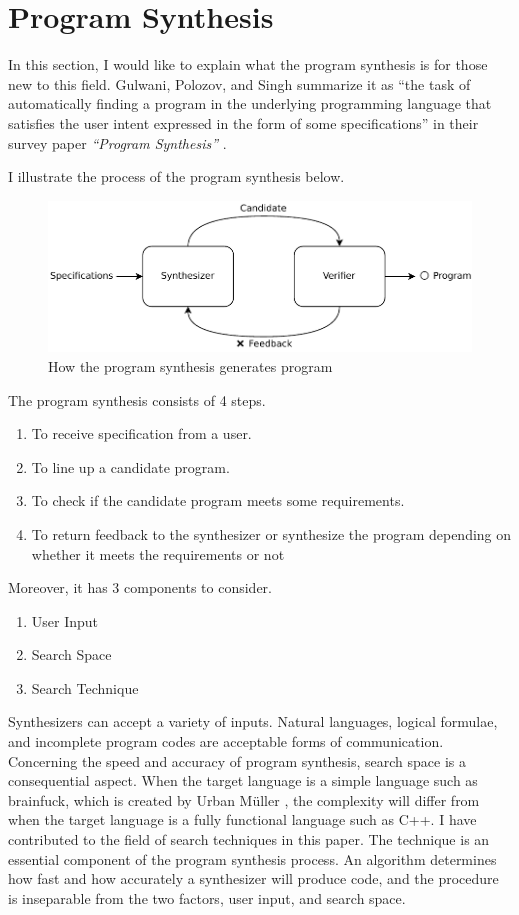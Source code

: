 \documentclass[12pt, a4paper, titlepage]{report}
\begin{document}
  \section{Program Synthesis}
    In this section, I would like to explain what the program synthesis is for those new to this field.
    Gulwani, Polozov, and Singh summarize it as ``the task of automatically finding a program in the underlying programming language that satisfies the user intent expressed in the form of some specifications'' in their survey paper \emph{``Program Synthesis''} \cite{gulwani:2017}.

    I illustrate the process of the program synthesis below.
    \begin{figure}[htbp]
      \centering
      \includegraphics[width=1\textwidth]{images/synthesis.pdf}
      \caption{How the program synthesis generates program}
      \label{synthesisOverview}
    \end{figure}

    The program synthesis consists of 4 steps.
    \begin{enumerate}
      \item To receive specification from a user.
      \item To line up a candidate program.
      \item To check if the candidate program meets some requirements.
      \item To return feedback to the synthesizer or synthesize the program depending on whether it meets the requirements or not
    \end{enumerate}

    Moreover, it has 3 components to consider.
    \begin{enumerate}
      \item User Input
      \item Search Space
      \item Search Technique
    \end{enumerate}
    Synthesizers can accept a variety of inputs.
    Natural languages, logical formulae, and incomplete program codes are acceptable forms of communication.
    Concerning the speed and accuracy of program synthesis, search space is a consequential aspect.
    When the target language is a simple language such as brainfuck, which is created by Urban Müller \cite{easter:2020}, the complexity will differ from when the target language is a fully functional language such as C++.
    I have contributed to the field of search techniques in this paper.
    The technique is an essential component of the program synthesis process.
    An algorithm determines how fast and how accurately a synthesizer will produce code, and the procedure is inseparable from the two factors, user input, and search space.
\end{document}
